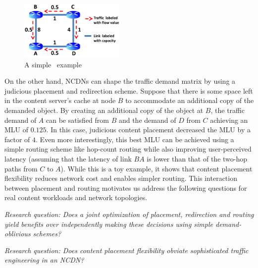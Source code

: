 \begin{figure}[h]
	\centering
	\includegraphics[width=2in]{ncdnpaper/ncdn-example}
	\caption{A simple \ncp\ example}
	\vspace{-.3in}
	\label{fig:NetworkExample}
\end{figure}

On the other hand, NCDNs can shape the traffic demand matrix by using a judicious placement and redirection scheme. Suppose that there is some space left in the content server's cache at node $B$ to accommodate an additional copy of the demanded object. By creating an additional copy of the object at $B$, the traffic demand of $A$ can be satisfied from $B$ and the demand of $D$ from $C$ achieving an MLU of $0.125$. In this case, judicious content placement decreased the MLU by a factor of $4$. Even more interestingly, this best MLU can be achieved using a simple routing scheme like hop-count routing while also improving user-perceived latency (assuming that the latency of link $BA$ is lower than that of the two-hop paths from $C$ to $A$). While this is a toy example, it shows that content placement flexibility reduces network cost and enables simpler routing. This interaction between placement and routing motivates us address the following questions for real content workloads and network topologies. 

\emph{Research question: Does a joint optimization of placement, redirection and routing yield benefits over independently making these decisions using simple demand-oblivious schemes?}

\emph{Research question: Does content placement flexibility obviate sophisticated traffic engineering in an NCDN?}




